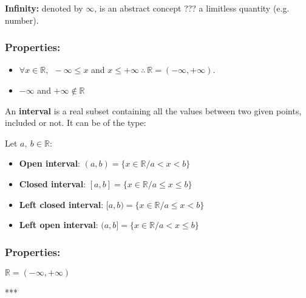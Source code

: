 \documentclass[12pt, a4paper]{book}
\begin{document}
\begin{defn}
  \textbf{Infinity:} denoted by $\infty$, is an abstract concept ??? a limitless quantity (e.g. number).
\end{defn}

\subsubsection*{Properties:}

\begin{itemize}
  \item $\forall x \in \mathbb{R}, \ \ - \infty \leq x$ and $x \leq + \infty \ \therefore \ \mathbb{R}=(-\infty, +\infty).$
  \item $-\infty$ and $+\infty \notin \mathbb{R}$
\end{itemize}

\begin{defn}
  An \textbf{interval} is a real subset containing all the values between two given points, included or not. It can be of the type: 
  
  Let $a, \ b \in \mathbb{R}$:
  \begin{itemize}
    \item \textbf{Open interval}: $(a,b) = \{x\in \mathbb{R} / a < x < b\}$
    \item \textbf{Closed interval}: $[a,b] = \{x\in \mathbb{R} / a \leq x \leq b\}$
    \item \textbf{Left closed interval}: $[a,b) = \{x\in \mathbb{R} / a \leq x<b\}$
    \item \textbf{Left open interval}: $(a,b] = \{x\in \mathbb{R} / a < x \leq b\}$
  \end{itemize}
\end{defn}

\subsubsection*{Properties:} $\mathbb{R} = (-\infty , +\infty)$

***
\end{document}
